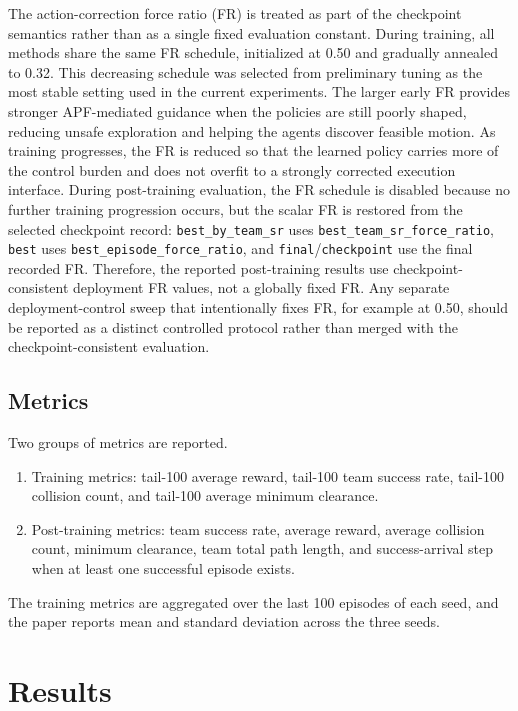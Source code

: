 \documentclass[a4paper,fleqn]{cas-dc}
\begin{document}
The action-correction force ratio (FR) is treated as part of the checkpoint semantics rather than as a single fixed evaluation constant. During training, all methods share the same FR schedule, initialized at 0.50 and gradually annealed to 0.32. This decreasing schedule was selected from preliminary tuning as the most stable setting used in the current experiments. The larger early FR provides stronger APF-mediated guidance when the policies are still poorly shaped, reducing unsafe exploration and helping the agents discover feasible motion. As training progresses, the FR is reduced so that the learned policy carries more of the control burden and does not overfit to a strongly corrected execution interface. During post-training evaluation, the FR schedule is disabled because no further training progression occurs, but the scalar FR is restored from the selected checkpoint record: \texttt{best\_by\_team\_sr} uses \texttt{best\_team\_sr\_force\_ratio}, \texttt{best} uses \texttt{best\_episode\_force\_ratio}, and \texttt{final}/\texttt{checkpoint} use the final recorded FR. Therefore, the reported post-training results use checkpoint-consistent deployment FR values, not a globally fixed FR. Any separate deployment-control sweep that intentionally fixes FR, for example at 0.50, should be reported as a distinct controlled protocol rather than merged with the checkpoint-consistent evaluation.

\subsection{Metrics}

Two groups of metrics are reported.

\begin{enumerate}
\item Training metrics: tail-100 average reward, tail-100 team success rate, tail-100 collision count, and tail-100 average minimum clearance.
\item Post-training metrics: team success rate, average reward, average collision count, minimum clearance, team total path length, and success-arrival step when at least one successful episode exists.
\end{enumerate}

The training metrics are aggregated over the last 100 episodes of each seed, and the paper reports mean and standard deviation across the three seeds.

\section{Results}
\end{document}
